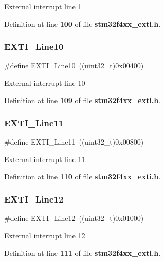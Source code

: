 External interrupt line 1 

Definition at line \textbf{ 100} of file \textbf{ stm32f4xx\+\_\+exti.\+h}.

\mbox{\label{group__EXTI__Lines_gaefb90b266f5fc1571ed4606bbff1f1d7}} 
\subsubsection{E\+X\+T\+I\+\_\+\+Line10}
{\footnotesize\ttfamily \#define E\+X\+T\+I\+\_\+\+Line10~((uint32\+\_\+t)0x00400)}

External interrupt line 10 

Definition at line \textbf{ 109} of file \textbf{ stm32f4xx\+\_\+exti.\+h}.

\mbox{\label{group__EXTI__Lines_ga6157b34c53e9b5cb8ee0d7ac3f5ba292}} 
\subsubsection{E\+X\+T\+I\+\_\+\+Line11}
{\footnotesize\ttfamily \#define E\+X\+T\+I\+\_\+\+Line11~((uint32\+\_\+t)0x00800)}

External interrupt line 11 

Definition at line \textbf{ 110} of file \textbf{ stm32f4xx\+\_\+exti.\+h}.

\mbox{\label{group__EXTI__Lines_gab73a0a31f1814118955099b9dd3bdfef}} 
\subsubsection{E\+X\+T\+I\+\_\+\+Line12}
{\footnotesize\ttfamily \#define E\+X\+T\+I\+\_\+\+Line12~((uint32\+\_\+t)0x01000)}

External interrupt line 12 

Definition at line \textbf{ 111} of file \textbf{ stm32f4xx\+\_\+exti.\+h}.

\mbox{\label{group__EXTI__Lines_gae382388ac34b78917a7bd06562e35c42}} 
